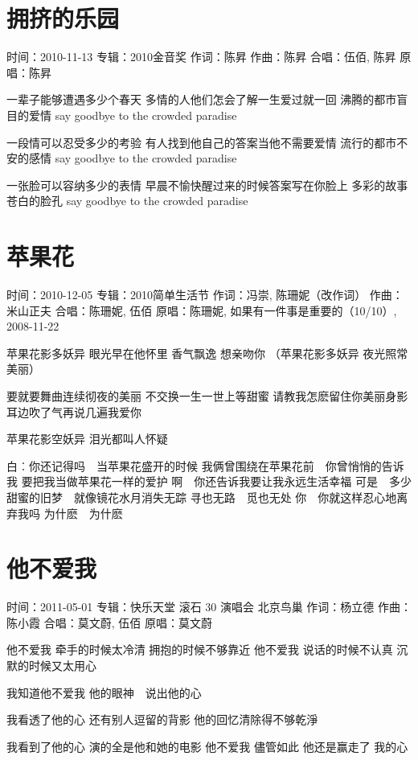 \documentclass[UTF8,a4paper,oneside,twocolumn,12pt]{ctexbook}
\newcommand{\infopair}[2]{\textbullet #1：#2}
\newcommand{\zc}[1][伍佰]{\infopair{作词}{#1}}
\newcommand{\zq}[1][伍佰]{\infopair{作曲}{#1}}
\newcommand{\zj}[1]{\infopair{专辑}{#1}}
\newcommand{\yc}[1]{\infopair{原唱}{#1}}
\newcommand{\sj}[1]{\infopair{时间}{#1}}
\newenvironment{info}{\begin{flushleft}\kaishu
	}
	{\end{flushleft}\normalsize\yahei\par}
\newenvironment{lyric}{
	}
{}
\begin{document}
\section{拥挤的乐园}%
\begin{info}
	\sj{2010-11-13}
	\zj{2010金音奖}
	\zc[陈昇]
	\zq[陈昇]
	\infopair{合唱}{伍佰, 陈昇}
	\yc{陈昇}
\end{info}
\begin{lyric}
	一辈子能够遭遇多少个春天
	多情的人他们怎会了解一生爱过就一回
	沸腾的都市盲目的爱情
	say goodbye to the crowded paradise

	一段情可以忍受多少的考验
	有人找到他自己的答案当他不需要爱情
	流行的都市不安的感情
	say goodbye to the crowded paradise

	一张脸可以容纳多少的表情
	早晨不愉快醒过来的时候答案写在你脸上
	多彩的故事苍白的脸孔
	say goodbye to the crowded paradise
\end{lyric}

\section{苹果花}
\begin{info}
	\sj{2010-12-05}
	\zj{2010简单生活节}
	\zc[冯崇, 陈珊妮（改作词）]
	\zq[米山正夫]
	\infopair{合唱}{陈珊妮, 伍佰}
	\yc{陈珊妮, 如果有一件事是重要的（10/10）, 2008-11-22}
\end{info}
\begin{lyric}
	苹果花影多妖异 眼光早在他怀里
	香气飘逸 想亲吻你
	（苹果花影多妖异 夜光照常美丽）

	要就要舞曲连续彻夜的美丽
	不交换一生一世上等甜蜜
	请教我怎麽留住你美丽身影
	耳边吹了气再说几遍我爱你

	苹果花影空妖异 泪光都叫人怀疑

	白︰你还记得吗　当苹果花盛开的时候
	我俩曾围绕在苹果花前　你曾悄悄的告诉我
	要把我当做苹果花一样的爱护
	啊　你还告诉我要让我永远生活幸福
	可是　多少甜蜜的旧梦　就像镜花水月消失无踪
	寻也无路　觅也无处
	你　你就这样忍心地离弃我吗
	为什麽　为什麽
\end{lyric}

\section{他不爱我}%
\begin{info}
	\sj{2011-05-01}
	\zj{快乐天堂 滚石 30 演唱会 北京鸟巢}
	\zc[杨立德]
	\zq[陈小霞]
	\infopair{合唱}{莫文蔚, 伍佰}
	\yc{莫文蔚}
\end{info}
\begin{lyric}
	他不爱我 牵手的时候太冷清 拥抱的时候不够靠近
	他不爱我 说话的时候不认真 沉默的时候又太用心

	我知道他不爱我
	他的眼神　说出他的心

	我看透了他的心 还有别人逗留的背影
	他的回忆清除得不够乾淨

	我看到了他的心 演的全是他和她的电影
	他不爱我 儘管如此 他还是赢走了 我的心
\end{lyric}
\end{document}
